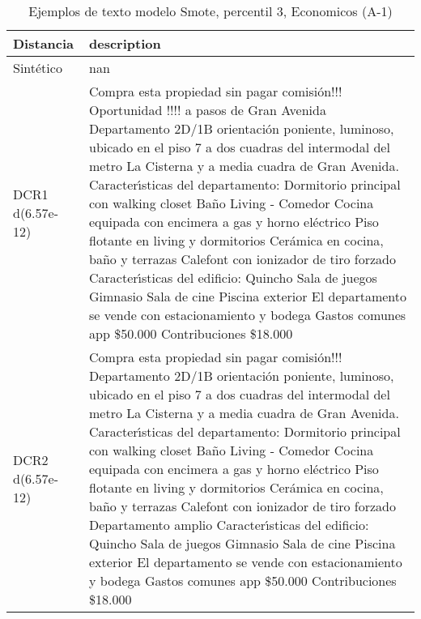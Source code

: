 \begin{table}[H]
\centering
\fontsize{10}{14}\selectfont
\caption{Ejemplos de texto modelo Smote, percentil 3, Economicos (A-1)}
\label{table-example-economicos-a-1-smote-enc-3p-text}
\begin{tabular}{|l|m{35em}|}
\hline
\rowcolor[gray]{0.8}
Distancia & description \\
\hline Sintético & nan \\
\hline DCR1 d(6.57e-12) & Compra esta propiedad sin pagar comisi\'on!!! Oportunidad !!!! a pasos de Gran Avenida  Departamento 2D/1B orientaci\'on poniente, luminoso, ubicado en el piso 7 a dos cuadras del intermodal del metro La Cisterna y a media cuadra de Gran Avenida.  Caracter{\'\i}sticas del departamento:  Dormitorio principal con walking closet Ba\~no Living - Comedor Cocina equipada con encimera a gas y horno el\'ectrico Piso flotante en living y dormitorios Cer\'amica en cocina, ba\~no y terrazas Calefont con ionizador de tiro forzado  Caracter{\'\i}sticas del edificio:  Quincho Sala de juegos Gimnasio Sala de cine Piscina exterior El departamento se vende con estacionamiento y bodega  Gastos comunes app \$50.000  Contribuciones \$18.000 \\
\hline DCR2 d(6.57e-12) & Compra esta propiedad sin pagar comisi\'on!!!  Departamento 2D/1B orientaci\'on poniente, luminoso, ubicado en el piso 7 a dos cuadras del intermodal del metro La Cisterna y a media cuadra de Gran Avenida.  Caracter{\'\i}sticas del departamento:  Dormitorio principal con walking closet Ba\~no Living - Comedor Cocina equipada con encimera a gas y horno el\'ectrico Piso flotante en living y dormitorios Cer\'amica en cocina, ba\~no y terrazas Calefont con ionizador de tiro forzado Departamento amplio  Caracter{\'\i}sticas del edificio:  Quincho Sala de juegos Gimnasio Sala de cine Piscina exterior El departamento se vende con estacionamiento y bodega  Gastos comunes app \$50.000  Contribuciones \$18.000 \\
\hline
\end{tabular}
\end{table}

